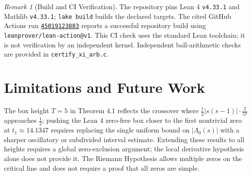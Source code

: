 \documentclass[11pt]{article}
\theoremstyle{remark}
\newtheorem{remark}[theorem]{Remark}
\begin{document}
\begin{remark}[Build and CI Verification]
The repository pins Lean 4 \texttt{v4.33.1} and Mathlib \texttt{v4.33.1}; \texttt{lake build} builds the declared targets. The cited GitHub Actions run \href{https://github.com/x357ai/Completed-Riemann-Zeta-Function-in-Lean-4/actions/runs/45019123883}{\texttt{45019123883}} reports a successful repository build using \texttt{leanprover/lean-action@v1}. This CI check uses the standard Lean toolchain; it is not verification by an independent kernel. Independent ball-arithmetic checks are provided in \texttt{certify\_\allowbreak xi\_\allowbreak arb.c}.
\end{remark}

\section{Limitations and Future Work}

The box height $T = 5$ in Theorem 4.1 reflects the crossover where $\frac{1}{2}|s(s-1)| \cdot \frac{2}{57}$ approaches $\frac{1}{2}$; pushing the Lean 4 zero-free box closer to the first nontrivial zero at $t_1 \approx 14.1347$ requires replacing the single uniform bound on $|\Lambda_0(s)|$ with a sharper oscillatory or subdivided interval estimate. Extending these results to all heights requires a global zero-exclusion argument; the local derivative hypothesis alone does not provide it. The Riemann Hypothesis allows multiple zeros on the critical line and does not require a proof that all zeros are simple.
\end{document}
